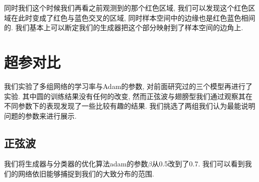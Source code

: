 \documentclass[lang=cn,11pt]{elegantpaper}
\begin{document}
同时我们这个时候我们再看之前观测到的那个红色区域, 我们可以发现这个红色区域在此时变成了红色与蓝色交叉的区域, 同时样本空间中的边缘也是红色蓝色相间的. 我们基本上可以断定我们的生成器把这个部分映射到了样本空间的边角上.

\section{超参对比}

我们实验了多组网络的学习率与Adam的参数, 对前面研究过的三个模型再进行了实验. 其中圆的训练结果没有任何的改变, 然而正弦波与翅膀型我们通过观察其在不同参数下的表现发现了一些比较有趣的结果. 我们挑选了两组我们认为最能说明问题的参数来进行展示.

\subsection{正弦波}

我们将生成器与分类器的优化算法adam的参数$\beta$从0.5改到了0.7. 我们可以看到我们的网络依旧能够捕捉到我们的大致分布的范围.
\end{document}
